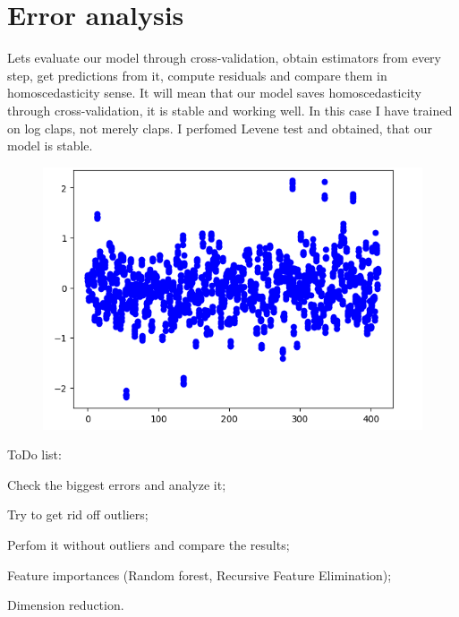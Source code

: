 \documentclass[12pt]{report}
\begin{document}
\section{Error analysis}
Lets evaluate our model through cross-validation, obtain estimators from every step, get predictions from it, compute residuals and compare them in homoscedasticity sense. It will mean that our model saves homoscedasticity through cross-validation, it is stable and working well. In this case I have trained on log claps, not merely claps. I perfomed Levene test and obtained, that our model is stable.
\begin{figure}[H]
    \centering
    \includegraphics[scale=0.5]{residuals.png} 
\end{figure} 
\newpage
{\Large ToDo list}:
\begin{todolist}
  \item Check the biggest errors and analyze it;
  \item Try to get rid off outliers;
  \item Perfom it without outliers and compare the results;
  \item Feature importances (Random forest, Recursive Feature Elimination);
  \item Dimension reduction.
\end{todolist}
\end{document}
